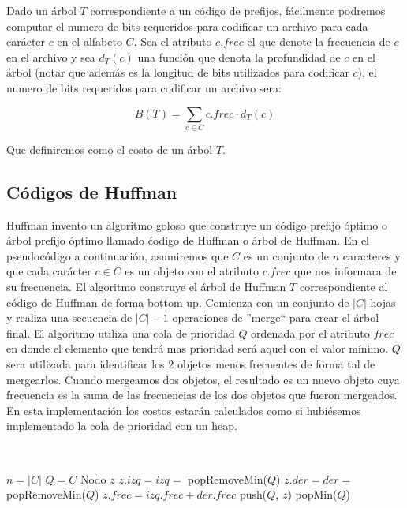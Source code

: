 Dado un \'arbol $T$ correspondiente a un c\'odigo de prefijos, f\'acilmente podremos computar el numero de bits requeridos para codificar un archivo para cada car\'acter $c$ en el alfabeto $C$. Sea el atributo $c.frec$ el que denote la frecuencia de $c$ en el archivo y sea $d_T(c)$ una funci\'on que denota la profundidad de $c$ en el \'arbol (notar que adem\'as es la longitud de bits utilizados para codificar $c$), el numero de bits requeridos para codificar un archivo sera:

\begin{equation*}
 B(T) = \sum_{c \in C} c.frec \cdot d_T(c)
\end{equation*}

Que definiremos como el costo de un \'arbol $T$.

\subsection{C\'odigos de Huffman}

Huffman invento un algoritmo goloso que construye un c\'odigo prefijo \'optimo o \'arbol prefijo \'optimo llamado \'codigo de Huffman o \'arbol de Huffman. En el pseudoc\'odigo a continuaci\'on, asumiremos que $C$ es un conjunto de $n$ caracteres y que cada car\'acter $c \in C$ es un objeto con el atributo $c.frec$ que nos informara de su frecuencia. El algoritmo construye el \'arbol de Huffman $T$ correspondiente al c\'odigo de Huffman de forma bottom-up. Comienza con un conjunto de $|C|$ hojas y realiza una secuencia de $|C|-1$ operaciones de ''merge`` para crear el \'arbol final. El algoritmo utiliza una cola de prioridad $Q$ ordenada por el atributo $frec$ en donde el elemento que tendr\'a mas prioridad ser\'a aquel con el valor m\'inimo. $Q$ sera utilizada para identificar los $2$ objetos menos frecuentes de forma tal de mergearlos. Cuando mergeamos dos objetos, el resultado es un nuevo objeto cuya frecuencia es la suma de las frecuencias de los dos objetos que fueron mergeados. En esta implementaci\'on
los costos estar\'an calculados como si hubi\'esemos implementado la cola de prioridad con un heap.

~

\begin{algorithmic}[1]
    \State $n = |C|$
    \State $Q = C$ 
      \State Nodo $z$
      \State $z.izq = izq = $ popRemoveMin($Q$) 
      \State $z.der = der = $ popRemoveMin($Q$) 
      \State $z.frec = izq.frec + der.frec$
      \State push($Q$, $z$) 
    \EndFor
    \State \Return popMin($Q$) 
 \EndFunction {}
\end{algorithmic}

